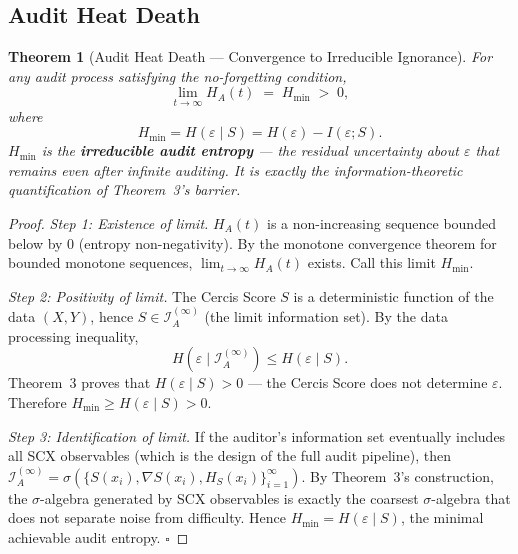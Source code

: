 \documentclass[12pt,a4paper]{article}
\newtheorem{theorem}{Theorem}[section]
\newcommand{\cI}{\mathcal{I}}
\begin{document}
\subsection{Audit Heat Death}

\begin{theorem}[Audit Heat Death — Convergence to Irreducible Ignorance]
\label{thm:heat-death}
For any audit process satisfying the no-forgetting condition,
\begin{equation}\label{eq:heat-death}
    \lim_{t\to\infty} H_A(t) \;=\; H_{\min} \;>\; 0,
\end{equation}
where
\begin{equation}\label{eq:H-min}
    H_{\min} = H(\varepsilon \mid S)
    = H(\varepsilon) - I(\varepsilon; S).
\end{equation}
$H_{\min}$ is the \textbf{irreducible audit entropy} — the residual
uncertainty about $\varepsilon$ that remains even after infinite auditing.
It is exactly the information-theoretic quantification of Theorem~3's barrier.
\end{theorem}

\begin{proof}
\textit{Step 1: Existence of limit.}
$H_A(t)$ is a non-increasing sequence bounded below by $0$ (entropy
non-negativity).  By the monotone convergence theorem for bounded monotone
sequences, $\lim_{t\to\infty}H_A(t)$ exists.  Call this limit $H_{\min}$.

\textit{Step 2: Positivity of limit.}
The Cercis Score $S$ is a deterministic function of the data $(X,Y)$, hence
$S\in\cI_A^{(\infty)}$ (the limit information set).  By the data processing
inequality,
\begin{equation}\label{eq:dpi-limit}
    H(\varepsilon\mid\cI_A^{(\infty)})
    \leq H(\varepsilon\mid S).
\end{equation}
Theorem~3 proves that $H(\varepsilon\mid S)>0$ — the Cercis Score does not
determine $\varepsilon$.  Therefore $H_{\min}\geq H(\varepsilon\mid S)>0$.

\textit{Step 3: Identification of limit.}
If the auditor's information set eventually includes all SCX observables
(which is the design of the full audit pipeline), then
$\cI_A^{(\infty)} = \sigma(\{S(x_i),\nabla S(x_i),H_S(x_i)\}_{i=1}^\infty)$.
By Theorem~3's construction, the $\sigma$-algebra generated by SCX observables
is exactly the coarsest $\sigma$-algebra that does not separate noise from
difficulty.  Hence $H_{\min}=H(\varepsilon\mid S)$, the minimal achievable
audit entropy. $\square$
\end{proof}
\end{document}
